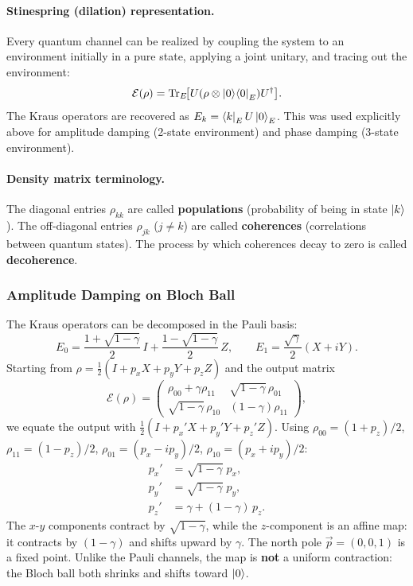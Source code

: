 \documentclass[10pt,a4paper]{article}
\begin{document}
\paragraph{Stinespring (dilation) representation.} Every quantum channel can be realized by coupling the system to an environment initially in a pure state, applying a joint unitary, and tracing out the environment:
\[
\mathcal{E}(\rho)=\mathrm{Tr}_E\!\bigl[U(\rho\otimes\ket{0}\!\bra{0}_E)U^\dagger\bigr].
\]
The Kraus operators are recovered as $E_k=\bra{k}_E U\ket{0}_E$. This was used explicitly above for amplitude damping (2-state environment) and phase damping (3-state environment).

\paragraph{Density matrix terminology.} The diagonal entries $\rho_{kk}$ are called \textbf{populations} (probability of being in state $\ket{k}$). The off-diagonal entries $\rho_{jk}$ ($j\ne k$) are called \textbf{coherences} (correlations between quantum states). The process by which coherences decay to zero is called \textbf{decoherence}.

\subsubsection*{Amplitude Damping on Bloch Ball}

The Kraus operators can be decomposed in the Pauli basis:
\[
E_0=\frac{1+\sqrt{1-\gamma}}{2}\,I+\frac{1-\sqrt{1-\gamma}}{2}\,Z,\qquad E_1=\frac{\sqrt{\gamma}}{2}(X+iY).
\]
Starting from $\rho=\frac{1}{2}(I+p_xX+p_yY+p_zZ)$ and the output matrix
\[
\mathcal{E}(\rho)=\begin{pmatrix}\rho_{00}+\gamma\rho_{11}&\sqrt{1-\gamma}\,\rho_{01}\\\sqrt{1-\gamma}\,\rho_{10}&(1-\gamma)\rho_{11}\end{pmatrix},
\]
we equate the output with $\frac{1}{2}(I+p_x'X+p_y'Y+p_z'Z)$. Using $\rho_{00}=(1+p_z)/2$, $\rho_{11}=(1-p_z)/2$, $\rho_{01}=(p_x-ip_y)/2$, $\rho_{10}=(p_x+ip_y)/2$:
\begin{align}
p_x'&=\sqrt{1-\gamma}\;p_x,\nonumber\\
p_y'&=\sqrt{1-\gamma}\;p_y,\nonumber\\
p_z'&=\gamma+(1-\gamma)\,p_z.\nonumber
\end{align}
The $x$-$y$ components contract by $\sqrt{1-\gamma}$, while the $z$-component is an affine map: it contracts by $(1-\gamma)$ and shifts upward by $\gamma$. The north pole $\vec{p}=(0,0,1)$ is a fixed point. Unlike the Pauli channels, the map is \textbf{not} a uniform contraction: the Bloch ball both shrinks and shifts toward $\ket{0}$.
\end{document}
